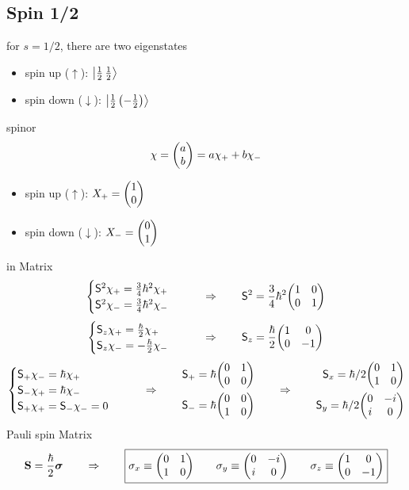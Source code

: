 \subsection{Spin 1/2}
for \(s=1/2\), there are two eigenstates
\begin{itemize}
       \item spin up (\(\uparrow\)): \(\ket{\frac{1}{2}\,\frac{1}{2}}\)
       \item spin down (\(\downarrow\)): \(\ket{\frac{1}{2}\,\qty(-\frac{1}{2})}\)
\end{itemize}
spinor \[\chi = \mqty(a \\ b) = a\chi_+ +b\chi_- \] 
\begin{itemize}
       \item spin up (\(\uparrow\)): \(X_+ = \mqty(1 \\ 0)\)
       \item spin down (\(\downarrow\)):  \(X_- = \mqty(0 \\ 1)\)
\end{itemize}
in Matrix
\[\begin{cases}
       \mathsf{S}^2\chi_+=\frac{3}{4}\hbar^2\chi_+ \\
       \mathsf{S}^2\chi_-=\frac{3}{4}\hbar^2\chi_- 
\end{cases}\qquad\Rightarrow\qquad\mathsf{S}^2 = \frac{3}{4}\hbar^2\mqty(1 & 0 \\ 0 & 1)\]
\[\begin{cases}
       \mathsf{S}_z\chi_+ = \frac{\hbar}{2}\chi_+ \\
       \mathsf{S}_z\chi_- = -\frac{\hbar}{2}\chi_-
\end{cases}\qquad\Rightarrow\qquad\mathsf{S}_z = \frac{\hbar}{2}\mqty(1 & 0 \\ 0 & -1)\]
\[\begin{cases}
       \mathsf{S}_+\chi_-=\hbar\chi_+ \\
       \mathsf{S}_-\chi_+=\hbar\chi_- \\
       \mathsf{S}_+\chi_+=\mathsf{S}_-\chi_-=0
\end{cases}\qquad\Rightarrow\qquad
\begin{aligned}
       \mathsf{S}_+=\hbar\mqty(0 & 1 \\ 0 & 0) \\
       \mathsf{S}_-=\hbar\mqty(0 & 0 \\ 1 & 0)
\end{aligned}\qquad\Rightarrow\qquad
\begin{aligned}
       \mathsf{S}_x=\hbar/2\mqty(0 & 1 \\ 1 & 0) \\
       \mathsf{S}_y=\hbar/2\mqty(0 & -i \\ i & 0)
\end{aligned}\]
Pauli spin Matrix
\[\mathbf{S} = \frac{\hbar}{2}\boldsymbol{\sigma}
\qquad\Rightarrow\qquad
\boxed{ \sigma_x\equiv\mqty(0 & 1\\ 1 & 0) \qquad 
\sigma_y\equiv\mqty(0 & -i\\ i & 0) \qquad
\sigma_z\equiv\mqty(1 & 0\\ 0 & -1)} \]
